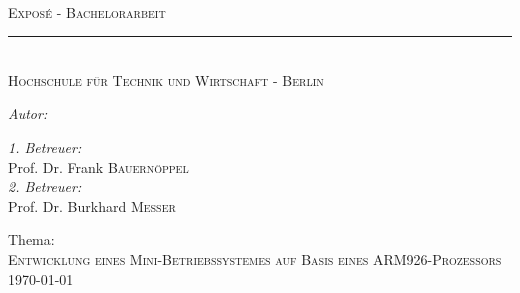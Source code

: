 \begin{titlepage}
	\begin{center}
		~\\[4cm]
		\textsc{\LARGE Exposé - Bachelorarbeit}
		\rule{\textwidth}{0.4pt} \\[1.5cm]
		\textsc{\Large Hochschule für Technik und Wirtschaft - Berlin}\\[1.5cm]

			\begin{minipage}{0.4\textwidth}
				\begin{flushleft}\large
				\emph{Autor:} \\
				\me
				\end{flushleft}	
			\end{minipage}
			\begin{minipage}{0.4\textwidth}
				\begin{flushright}\large
				\emph{1. Betreuer:}\\
				Prof. Dr. Frank \textsc{Bauernöppel}\\[0.3cm]
				\emph{2. Betreuer:}\\
				Prof. Dr. Burkhard \textsc{Messer}
				\end{flushright}
			\end{minipage}
			
		\vspace{5 cm}
		\LARGE{Thema:} \\ [0.2cm]
		\textsc{\large{Entwicklung eines Mini-Betriebssystemes auf Basis eines ARM926-Prozessors}}
		\vfill
		{\large \today}
	\end{center}
\end{titlepage}